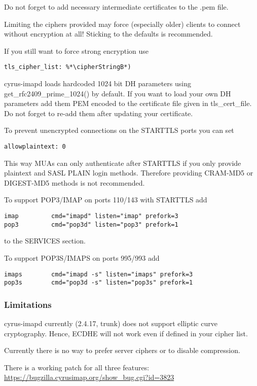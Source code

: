 Do not forget to add necessary intermediate certificates to the .pem file.

Limiting the ciphers provided may force (especially older) clients to connect without encryption at all! Sticking to the defaults is recommended.

If you still want to force strong encryption use
\begin{lstlisting}
tls_cipher_list: %*\cipherStringB*)
\end{lstlisting}

cyrus-imapd loads hardcoded 1024 bit DH parameters using get\_rfc2409\_prime\_1024() by default. If you want to load your own DH parameters add them PEM encoded to the certificate file given in tls\_cert\_file. Do not forget to re-add them after updating your certificate.

To prevent unencrypted connections on the STARTTLS ports you can set
\begin{lstlisting}
allowplaintext: 0
\end{lstlisting}
This way MUAs can only authenticate after STARTTLS if you only provide plaintext and SASL PLAIN login methods. Therefore providing CRAM-MD5 or DIGEST-MD5 methods is not recommended.


To support POP3/IMAP on ports 110/143 with STARTTLS add
\begin{lstlisting}
imap         cmd="imapd" listen="imap" prefork=3
pop3         cmd="pop3d" listen="pop3" prefork=1
\end{lstlisting}
to the SERVICES section.

To support POP3S/IMAPS on ports 995/993 add
\begin{lstlisting}
imaps        cmd="imapd -s" listen="imaps" prefork=3
pop3s        cmd="pop3d -s" listen="pop3s" prefork=1
\end{lstlisting}


\subsubsection{Limitations}

cyrus-imapd currently (2.4.17, trunk) does not support elliptic curve cryptography. Hence, ECDHE will not work even if defined in your cipher list.

Currently there is no way to prefer server ciphers or to disable compression.

There is a working patch for all three features:
\url{https://bugzilla.cyrusimap.org/show_bug.cgi?id=3823}

